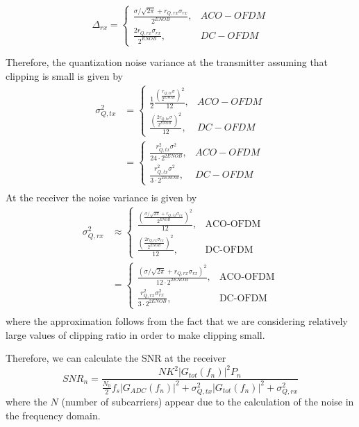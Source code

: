 \documentclass[a4paper]{article}
\begin{document}
\begin{equation}
\Delta_{rx} = \begin{cases}
\frac{\sigma/\sqrt{2\pi} + r_{Q,rx}\sigma_{rx}}{2^{ENOB}}, & ACO-OFDM \\
\frac{2r_{Q,rx}\sigma_{rx}}{2^{ENOB}}, & DC-OFDM 
\end{cases}
\end{equation}

Therefore, the quantization noise variance at the transmitter assuming that clipping is small is given by
\begin{align} \nonumber
\sigma^2_{Q, tx} &= \begin{cases}
\frac{1}{2}\frac{(\frac{r_{Q,tx}\sigma}{2^{ENOB}})^2}{12}, & ACO-OFDM \\
\frac{(\frac{2r_{Q,tx}\sigma}{2^{ENOB}})^2}{12}, & DC-OFDM 
\end{cases} \\ \nonumber 
& = \begin{cases}
\frac{r_{Q,tx}^2\sigma^2}{24\cdot 2^{2ENOB}}, & ACO-OFDM \\
\frac{r_{Q,tx}^2\sigma^2}{3\cdot 2^{2ENOB}}, & DC-OFDM 
\end{cases}\\ \nonumber 
\end{align}At the receiver the noise variance is given by
\begin{align} \nonumber
\sigma^2_{Q,rx} & \approx \begin{cases}
\frac{(\frac{\sigma/\sqrt{2\pi} + r_{Q,rx}\sigma_{rx}}{2^{ENOB}})^2}{12}, & \text{ACO-OFDM} \\
\frac{(\frac{2r_{Q,rx}\sigma_{rx}}{2^{ENOB}})^2}{12}, & \text{DC-OFDM}
\end{cases} \\ \nonumber
& = \begin{cases}
\frac{(\sigma/\sqrt{2\pi} + r_{Q,rx}\sigma_{rx})^2}{12\cdot 2^{2ENOB}}, & \text{ACO-OFDM} \\
\frac{r_{Q,rx}^2\sigma_{rx}^2}{3\cdot 2^{2ENOB}}, & \text{DC-OFDM}
\end{cases} \\
\end{align}
where the approximation follows from the fact that we are considering relatively large values of clipping ratio in order to make clipping small.

Therefore, we can calculate the SNR at the receiver
\begin{equation}
SNR_n = \frac{NK^2|G_{tot}(f_n)|^2P_n}{\frac{N_0}{2}f_s|G_{ADC}(f_n)|^2 + \sigma_{Q,tx}^2|G_{tot}(f_n)|^2 + \sigma_{Q,rx}^2}
\end{equation}
where the $N$ (number of subcarriers) appear due to the calculation of the noise in the frequency domain. 
\end{document}
